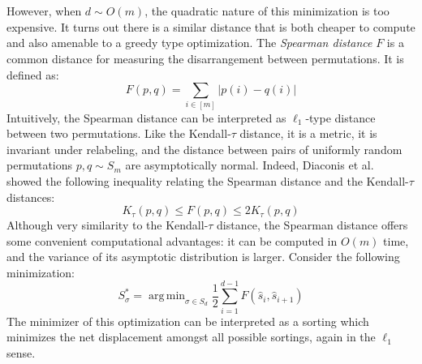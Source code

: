 \documentclass{siamart190516}
\DeclareMathOperator*{\argmin}{arg\,min}
\begin{document}
\\
\\
However, when $d \sim O(m)$, the quadratic nature of this minimization is too expensive. It turns out there is a similar distance that is both cheaper to compute and also amenable to a greedy type optimization. The \emph{Spearman distance} $F$ is a common distance for measuring the disarrangement between permutations. It is defined as:
\begin{equation}\label{eq:spearman_dist}
F(p, q) = \sum\limits_{i \in [m]} \lvert p(i) - q(i) \rvert
\end{equation}
Intuitively, the Spearman distance can be interpreted as $\ell_1$-type distance between two permutations. Like the Kendall-$\tau$ distance, it is a metric, it is invariant under relabeling, and the distance between pairs of uniformly random permutations $p, q \sim S_m$ are asymptotically normal. 
Indeed, Diaconis et al.~\cite{diaconis1977spearman} showed the following inequality relating the Spearman distance and the Kendall-$\tau$ distances:
\begin{equation}\label{eq:diaconis_inequality}
K_\tau(p, q) \leq F(p, q) \leq 2 K_\tau(p, q)
\end{equation}
Although very similarity to the Kendall-$\tau$ distance, the Spearman distance offers some convenient computational advantages: it can be computed in $O(m)$ time, and the variance of its asymptotic distribution is larger. Consider the following minimization: 
\begin{equation}\label{eq:schedule_opt_succ}
S_{\sigma}^\ast = \argmin_{\sigma \in S_d} \frac{1}{2} \sum\limits_{i = 1}^{d - 1} F(\hat{s}_i, \hat{s}_{i+1})
\end{equation}
The minimizer of this optimization can be interpreted as a sorting which minimizes the net displacement amongst all possible sortings, again in the $\ell_1$ sense. 
\end{document}
